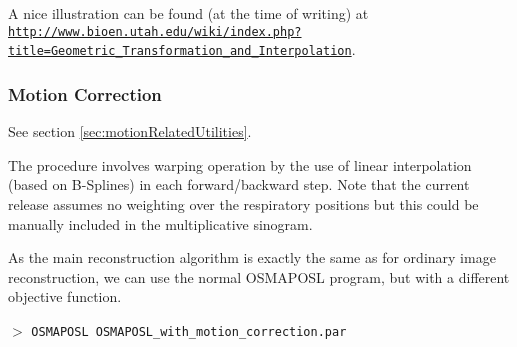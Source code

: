\documentclass{article}
\def\R2Lurl#1#2{\mbox{\href{#1}{\tt #2}}}
\newcommand{\cmdline}[1]{\par \noindent $>$ \texttt{#1}\par}
\begin{document}
A nice illustration can be found (at the time of writing) at\\ 
{ \small
\R2Lurl{http://www.bioen.utah.edu/wiki/index.php?title=Geometric_Transformation_and_Interpolation}{http://www.bioen.utah.edu/wiki/index.php?title=Geometric\_Transformation\_and\_Interpolation}}.

\subsubsection{Motion Correction}

{ 
}
See section \ref{sec:motionRelatedUtilities}.

{ 
}

The procedure involves warping operation by the use of linear interpolation (based
on B-Splines) in each forward/backward step. Note that the current release
assumes no weighting over the respiratory positions but this could be manually
included in the multiplicative sinogram.

As the main reconstruction algorithm is exactly the same as for ordinary image
reconstruction, we can use the normal OSMAPOSL program, but with a different
objective function. 

\cmdline{OSMAPOSL OSMAPOSL\_with\_motion\_correction.par}
\end{document}
